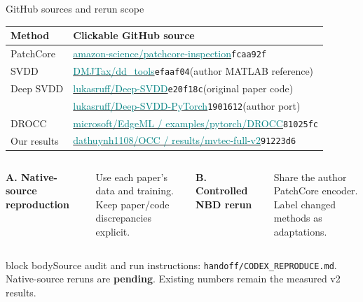 \documentclass[aspectratio=169,professionalfonts,10pt]{beamer}
\def\phase{NBD}
\newcommand{\head}[1]{\par{\normalsize\bfseries\color{navy}#1}\par\vspace{2pt}}
\newcommand{\band}[1]{\begin{beamercolorbox}[rounded=true,sep=0.17cm]{block body}#1\end{beamercolorbox}}
\begin{document}
\def\phase{REPRODUCTION LINKS}
\begin{frame}[t]{GitHub sources and rerun scope}
\small
\renewcommand{\arraystretch}{1.28}
\begin{tabularx}{\textwidth}{@{}p{2.25cm}Y@{}}
\toprule
\textbf{Method}&\textbf{Clickable GitHub source}\\
\midrule
PatchCore & \href{https://github.com/amazon-science/patchcore-inspection/tree/fcaa92f124fb1ad74a7acf56726decd4b27cbcad}{\textcolor{teal}{amazon-science/patchcore-inspection}}\quad\texttt{fcaa92f}\\
SVDD & \href{https://github.com/DMJTax/dd_tools/tree/efaaf04efae1f8be78906836a5d31547b48be7af}{\textcolor{teal}{DMJTax/dd\_tools}}\quad\texttt{efaaf04}\quad(author MATLAB reference)\\
Deep SVDD & \href{https://github.com/lukasruff/Deep-SVDD/tree/e20f18c8d0ad9dc01cad09fdf311bd861351a9ad}{\textcolor{teal}{lukasruff/Deep-SVDD}}\quad\texttt{e20f18c}\quad(original paper code)\\
& \href{https://github.com/lukasruff/Deep-SVDD-PyTorch/tree/1901612d595e23675fb75c4ebb563dd0ffebc21e}{\textcolor{teal}{lukasruff/Deep-SVDD-PyTorch}}\quad\texttt{1901612}\quad(author port)\\
DROCC & \href{https://github.com/microsoft/EdgeML/tree/81025fce8ba28707eabe72e11bf3987a8d745608/examples/pytorch/DROCC}{\textcolor{teal}{microsoft/EdgeML / examples/pytorch/DROCC}}\quad\texttt{81025fc}\\
Our results & \href{https://github.com/dathuynh1108/OCC/tree/91223d63adc3289786bbdeff16d5feeb59aeb3d7/results/mvtec-full-v2}{\textcolor{teal}{dathuynh1108/OCC / results/mvtec-full-v2}}\quad\texttt{91223d6}\\
\bottomrule
\end{tabularx}
\vspace{.12cm}
\begin{columns}[T,onlytextwidth]
\head{A. Native-source reproduction}
Use each paper's data and training.\\
Keep paper/code discrepancies explicit.
\head{B. Controlled NBD rerun}
Share the author PatchCore encoder.\\
Label changed methods as adaptations.
\end{columns}
\vspace{.12cm}
\band{\footnotesize Source audit and run instructions: \texttt{handoff/CODEX\_REPRODUCE.md}.\\[.05cm]
Native-source reruns are \textbf{pending}. Existing numbers remain the measured v2 results.}
\end{frame}
\end{document}
